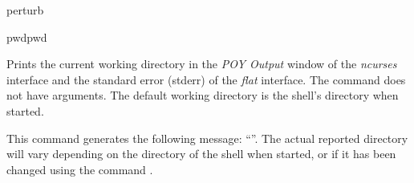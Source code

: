 \begin{command}{perturb}{}
\begin{poyexamples}
    \end{poyexamples}
               
    \begin{poyalso}
    \end{poyalso}
    
\end{command}



   
\begin{command}{pwd}{pwd}

    \syntax{\obligatory{()}}
    
    \begin{poydescription}
         Prints the current working directory in the \emph{POY Output} window of
         the \emph{ncurses} interface and the standard error (stderr) of the \emph{flat} interface.
         The command  does not have arguments. The default
         working directory is the shell's directory when \poy started.
    \end{poydescription}
    
    \begin{poyexamples}
            {This command generates the following message: ``''. The actual reported
            directory will vary depending on the directory of the shell when
            \poy started, or if it has been changed using the command
            .}
    \end{poyexamples}

    \begin{poyalso}
    \end{poyalso}

\end{command}



   
